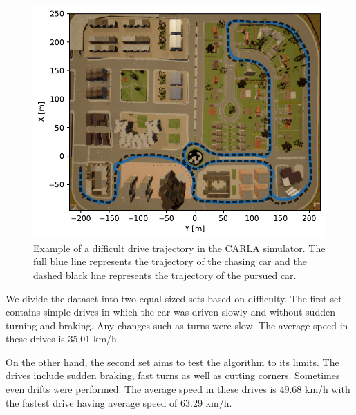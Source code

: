 \documentclass{ctuthesis/ctuthesis}
\begin{document}
\begin{figure}[]
    \centering
    \includegraphics[width=1\textwidth]{images/trajectory_img_h.pdf}
    \caption[Example of a difficult drive trajectory in the CARLA simulator]{Example of a difficult drive trajectory in the CARLA simulator. The full blue line represents the trajectory of the chasing car and the dashed black line represents the trajectory of the pursued car. }\label{f:trajectory}
\end{figure}


We divide the dataset into two equal-sized sets based on difficulty. The first set contains simple drives in which the car was driven slowly and without sudden turning and braking. Any changes such as turns were slow. The average speed in these drives is 35.01 km/h.\par


On the other hand, the second set aims to test the algorithm to its limits. The drives include sudden braking, fast turns as well as cutting corners. Sometimes even drifts were performed. The average speed in these drives is 49.68 km/h with the fastest drive having average speed of 63.29 km/h. %


    
\end{document}
